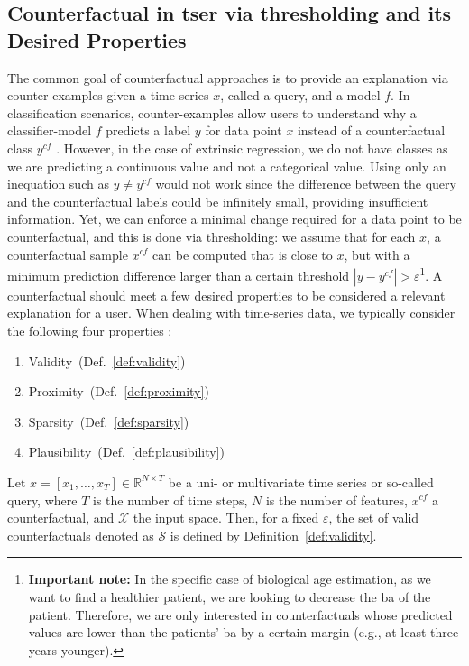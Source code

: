 \subsection{Counterfactual in \gls{tser} via thresholding and its Desired Properties} 
\label{sec:methods:tser_threshold}
The common goal of counterfactual approaches is to provide an explanation via counter-examples given a time series $x$, called a query, and a model $f$. In classification scenarios, counter-examples allow users to understand why a classifier-model $f$ predicts a label $y$ for data point $x$ instead of a counterfactual class $y^{c f}$ \cite{wachter_counterfactual_2018}. However, in the case of extrinsic regression, we do not have classes as we are predicting a continuous value and not a categorical value. Using only an inequation such as $y \neq y^{c f}$  would not work since the difference between the query and the counterfactual labels could be infinitely small, providing insufficient information. Yet, we can enforce a minimal change required for a data point to be counterfactual, and this is done via thresholding: we assume that for each $x$, a counterfactual sample $x^{c f}$ can be computed that is close to $x$, but with a minimum prediction difference larger than a certain threshold $|y - y^{c f}| > \varepsilon$\footnote{\textbf{Important note:} In the specific case of biological age estimation, as we want to find a healthier patient, we are looking to decrease the \gls{ba} of the patient. Therefore, we are only interested in counterfactuals whose predicted values are lower than the patients' \gls{ba} by a certain margin (e.g., at least three years younger).}. A counterfactual should meet a few desired properties to be considered a relevant explanation for a user.
When dealing with time-series data, we typically consider the following four properties \cite{delaney_instance-based_2021}:
\begin{enumerate}
    \item Validity~(Def.~\ref{def:validity})
    \item Proximity~(Def.~\ref{def:proximity})
    \item Sparsity~(Def.~\ref{def:sparsity})
    \item Plausibility~(Def.~\ref{def:plausibility})
\end{enumerate}

Let $x=\left[x_{1}, \ldots, x_{T}\right] \in \mathbb{R}^{N \times T}$ be a uni- or multivariate time series or so-called query, where $T$ is the number of time steps, $N$ is the number of features, $x^{cf}$ a counterfactual, and $\mathcal{X}$ the input space.
Then, for a fixed $\varepsilon$, the set of valid counterfactuals denoted as $\mathcal{S}$ is defined by Definition~\ref{def:validity}.

